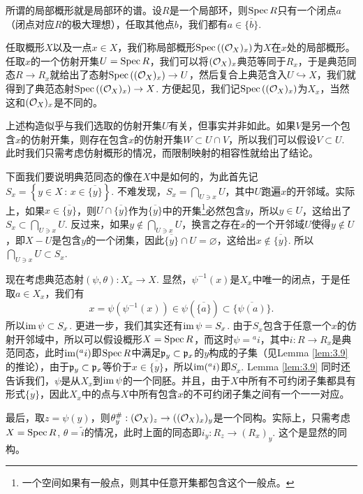 \begin{para}[局部概形]
所谓的局部概形就是局部环的谱。设$R$是一个局部环，则$\operatorname{Spec} R$只有一个闭点$a$（闭点对应$R$的极大理想），任取其他点$b$，我们都有$a\in\overline{\{b\}}$.

任取概形$X$以及一点$x\in X$，我们称局部概形$\operatorname{Spec}\left((\mathcal{O}_{X})_x\right)$为$X$在$x$处的局部概形。任取$x$的一个仿射开集$U=\operatorname{Spec} R$，我们可以将$(\mathcal{O}_{X})_x$典范等同于$R_x$，于是典范同态$R\to R_x$就给出了态射$\operatorname{Spec}\left((\mathcal{O}_{X})_x\right)\to U$，然后复合上典范含入$U\hookrightarrow X$，我们就得到了典范态射$\operatorname{Spec}\left((\mathcal{O}_{X})_x\right)\to X$. 方便起见，我们记$\operatorname{Spec}\left((\mathcal{O}_{X})_x\right)$为$X_x$，当然这和$(\mathcal{O}_X)_x$是不同的。

上述构造似乎与我们选取的仿射开集$U$有关，但事实并非如此。如果$V$是另一个包含$x$的仿射开集，则存在包含$x$的仿射开集$W\subset U\cap V$，所以我们可以假设$V\subset U$. 此时我们只需考虑仿射概形的情况，而限制映射的相容性就给出了结论。

下面我们要说明典范同态的像在$X$中是如何的，为此首先记$S_x=\left\{y\in X\,:\, x\in \overline{\{y\}}\right\}$. 不难发现，$S_x=\bigcap_{U\ni x}U$，其中$U$跑遍$x$的开邻域。实际上，如果$x\in \overline{\{y\}}$，则$U\cap \overline{\{y\}}$作为$\overline{\{y\}}$中的开集\footnote{一个空间如果有一般点，则其中任意开集都包含这个一般点。}必然包含$y$，所以$y\in U$，这给出了$S_x\subset \bigcap_{U\ni x}U$. 反过来，如果$y\not\in \bigcap_{U\ni x}U$，换言之存在$x$的一个开邻域$U$使得$y\not\in U$，即$X-U$是包含$y$的一个闭集，因此$\overline{\{y\}}\cap U=\varnothing$，这给出$x\not\in \overline{\{y\}}$. 所以$\bigcap_{U\ni x}U\subset S_x$.

现在考虑典范态射$(\psi,\theta):X_x\to X$. 显然，$\psi^{-1}(x)$是$X_x$中唯一的闭点，于是任取$a\in X_x$，我们有
\[
	x=\psi(\psi^{-1}(x))\in \psi\left(\overline{\{a\}}\right)\subset \overline{\{\psi(a)\}}.
\]
所以$\operatorname{im} \psi\subset S_x$. 更进一步，我们其实还有$\operatorname{im} \psi=S_x$. 由于$S_x$包含于任意一个$x$的仿射开邻域中，所以可以假设概形$X=\operatorname{Spec} R$，而这时$\psi={}^a i$，其中$i:R\to R_x$是典范同态，此时$\operatorname{im}({}^a i)$即$\operatorname{Spec} R$中满足$\mathfrak{p}_y\subset \mathfrak{p}_x$的$y$构成的子集（见Lemma \ref{lem:3.9} 的推论），由于$\mathfrak{p}_y\subset \mathfrak{p}_x$等价于$x\in \overline{\{y\}}$，所以$\operatorname{im}({}^a i)$即$S_x$. Lemma \ref{lem:3.9} 同时还告诉我们，$\psi$是从$X_x$到$\operatorname{im}\psi$的一个同胚。并且，由于$X$中所有不可约闭子集都具有形式$\overline{\{y\}}$，因此$X_x$中的点与$X$中所有包含$x$的不可约闭子集之间有一个一一对应。

最后，取$z=\psi(y)$，则$\theta_y^\#:(\mathcal{O}_X)_z\to ((\mathcal{O}_X)_x)_y$是一个同构。实际上，只需考虑$X=\operatorname{Spec} R$, $\theta=\widetilde{i}$的情况，此时上面的同态即$i_y:R_z\to (R_x)_y$. 这个是显然的同构。
\end{para}

